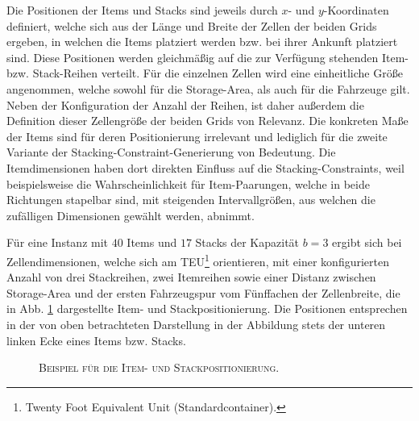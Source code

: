 Die Positionen der Items und Stacks sind jeweils durch $x$- und $y$-Koordinaten definiert,
welche sich aus der Länge und Breite der Zellen der beiden Grids ergeben, in welchen die Items platziert werden
bzw. bei ihrer Ankunft platziert sind. Diese Positionen werden gleichmäßig auf die zur Verfügung stehenden
Item- bzw. Stack-Reihen verteilt. Für die einzelnen Zellen wird eine einheitliche Größe angenommen,
welche sowohl für die Storage-Area, als auch für die Fahrzeuge gilt. Neben der Konfiguration der Anzahl der Reihen,
ist daher außerdem die Definition dieser Zellengröße der beiden Grids von Relevanz.
Die konkreten Maße der Items sind für deren Positionierung irrelevant und lediglich für
die zweite Variante der Stacking-Constraint-Generierung von Bedeutung.
Die Itemdimensionen haben dort direkten Einfluss auf die Stacking-Constraints,
weil beispielsweise die Wahrscheinlichkeit für Item-Paarungen, welche in beide Richtungen stapelbar sind,
mit steigenden Intervallgrößen, aus welchen die zufälligen Dimensionen gewählt werden, abnimmt.

Für eine Instanz mit $40$ Items und $17$ Stacks der Kapazität $b = 3$ ergibt sich bei
Zellendimensionen, welche sich am TEU\footnote{Twenty Foot Equivalent Unit (Standardcontainer).} orientieren,
mit einer konfigurierten Anzahl von drei Stackreihen,
zwei Itemreihen sowie einer Distanz zwischen Storage-Area und der ersten Fahrzeugspur vom Fünffachen
der Zellenbreite, die in Abb. \ref{fig:positioning_example} dargestellte Item- und Stackpositionierung.
Die Positionen entsprechen in der von oben betrachteten Darstellung in der Abbildung stets der unteren linken Ecke
eines Items bzw. Stacks.

\begin{figure}[H]
\centering
{}
\caption{\textsc{Beispiel für die Item- und Stackpositionierung.}}
\label{fig:positioning_example}
\end{figure}

